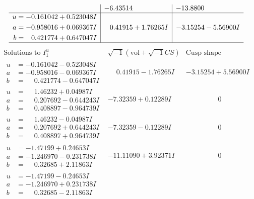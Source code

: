 \documentclass[1p]{elsarticle_modified}
\theoremstyle{definition}
\newcommand{\I}{\sqrt{-1}}
\begin{document}
$$\begin{array}{c|c|c}
 & -6.43514\phantom{ +0.000000I} & -13.8800\phantom{ +0.000000I} \\ \hline\begin{aligned}
u &= -0.161042 + 0.523048 I \\
a &= -0.958016 + 0.069367 I \\
b &= \phantom{-}0.421774 + 0.647047 I\end{aligned}
 & \phantom{-}0.41915 + 1.76265 I & -3.15254 - 5.56900 I\\
 \hline 
 \end{array}$$\newpage$$\begin{array}{c|c|c}  
\text{Solutions to }I^u_{1}& \I (\text{vol} + \sqrt{-1}CS) & \text{Cusp shape}\\
 \hline 
\begin{aligned}
u &= -0.161042 - 0.523048 I \\
a &= -0.958016 - 0.069367 I \\
b &= \phantom{-}0.421774 - 0.647047 I\end{aligned}
 & \phantom{-}0.41915 - 1.76265 I & -3.15254 + 5.56900 I \\ \hline\begin{aligned}
u &= \phantom{-}1.46232 + 0.04987 I \\
a &= \phantom{-}0.207692 - 0.644243 I \\
b &= \phantom{-}0.408897 - 0.964739 I\end{aligned}
 & -7.32359 + 0.12289 I & \phantom{-0.000000 } 0 \\ \hline\begin{aligned}
u &= \phantom{-}1.46232 - 0.04987 I \\
a &= \phantom{-}0.207692 + 0.644243 I \\
b &= \phantom{-}0.408897 + 0.964739 I\end{aligned}
 & -7.32359 - 0.12289 I & \phantom{-0.000000 } 0 \\ \hline\begin{aligned}
u &= -1.47199 + 0.24653 I \\
a &= -1.246970 - 0.231738 I \\
b &= \phantom{-}0.32685 + 2.11863 I\end{aligned}
 & -11.11090 + 3.92371 I & \phantom{-0.000000 } 0 \\ \hline\begin{aligned}
u &= -1.47199 - 0.24653 I \\
a &= -1.246970 + 0.231738 I \\
b &= \phantom{-}0.32685 - 2.11863 I\end{aligned}

\end{array}$$
\end{document}
